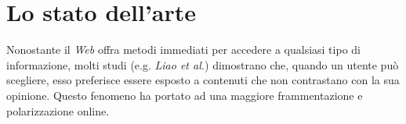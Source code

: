 \chapter{Lo stato dell'arte}
\label{chap:stato}
Nonostante il \textit{Web} offra metodi immediati per accedere a qualsiasi tipo di informazione, molti studi (e.g. \textit{Liao et al.}\cite{liao:paper}) dimostrano che, quando un utente può scegliere, esso preferisce essere esposto a contenuti che non contrastano con la sua opinione. Questo fenomeno ha portato ad una maggiore frammentazione e polarizzazione online.
